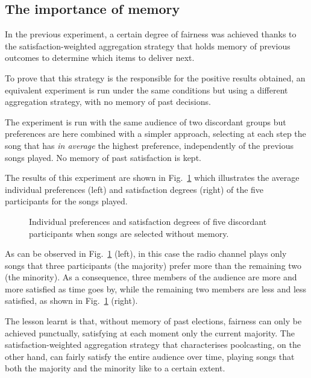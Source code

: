 \subsection{The importance of memory} %
\label{sub:comparison_with_plurality_voting}

In the previous experiment, a certain degree of fairness was achieved thanks to the satisfaction-weighted aggregation strategy that holds memory of previous outcomes to determine which items to deliver next.

To prove that this strategy is the responsible for the positive results obtained, an equivalent experiment is run under the same conditions but using a different aggregation strategy, with no memory of past decisions.

The experiment is run with the same audience of two discordant groups but preferences are here combined with a simpler approach, selecting at each step the song that has \emph{in average} the highest preference, independently of the previous songs played. No memory of past satisfaction is kept.

The results of this experiment are shown in Fig.~\ref{fig:fair_2} which illustrates the average individual preferences (left) and satisfaction degrees (right) of the five participants for the songs played.
%
\begin{figure}[bthp]
\centering \setlength{\abovecaptionskip}{3pt}
\caption{Individual preferences and satisfaction degrees of five discordant participants when songs are selected without memory.}
\label{fig:fair_2}
\end{figure}

As can be observed in Fig.~\ref{fig:fair_2} (left), in this case the radio channel plays only songs that three participants (the majority) prefer more than the remaining two (the minority).
As a consequence, three members of the audience are more and more satisfied as time goes by, while the remaining two members are less and less satisfied, as shown in Fig.~\ref{fig:fair_2} (right).

The lesson learnt is that, without memory of past elections, fairness can only be achieved punctually, satisfying at each moment only the current majority.
The satisfaction-weighted aggregation strategy that characterises poolcasting, on the other hand, can fairly satisfy the entire audience over time, playing songs that both the majority and the minority like to a certain extent.


